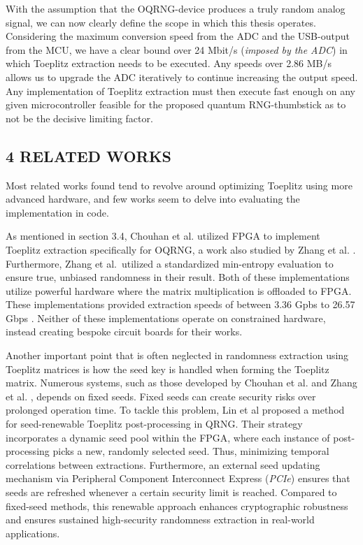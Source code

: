 \documentclass{sigchi}
\begin{document}
With the assumption that the OQRNG-device produces a truly random analog signal, we can now clearly define the scope in which this thesis operates. Considering the maximum conversion speed from the ADC and the USB-output from the MCU, we have a clear bound over 24 Mbit/s (\emph{imposed by the ADC}) in which Toeplitz extraction needs to be executed. Any speeds over 2.86 MB/s allows us to upgrade the ADC iteratively to continue increasing the output speed. Any implementation of Toeplitz extraction must then execute fast enough on any given microcontroller feasible for the proposed quantum RNG-thumbstick as to not be the decisive limiting factor.

\subsection{4 RELATED WORKS}\label{related-works}

Most related works found tend to revolve around optimizing Toeplitz using more advanced hardware, and few works seem to delve into evaluating the implementation in code.

As mentioned in section 3.4, Chouhan et al. \cite{toeplitz-desc} utilized FPGA to implement Toeplitz extraction specifically for OQRNG, a work also studied by Zhang et al. \cite{toeplitz}. Furthermore, Zhang et al.~utilized a standardized min-entropy evaluation to ensure true, unbiased randomness in their result. Both of these implementations utilize powerful hardware where the matrix multiplication is offloaded to FPGA. These implementations provided extraction speeds of between 3.36 Gpbs \cite{toeplitz} to 26.57 Gbps \cite{toeplitz-desc}. Neither of these implementations operate on constrained hardware, instead creating bespoke circuit boards for their works.

Another important point that is often neglected in randomness extraction using Toeplitz matrices is how the seed key is handled when forming the Toeplitz matrix. Numerous systems, such as those developed by Chouhan et al. \cite{toeplitz-desc} and Zhang et al. \cite{toeplitz}, depends on fixed seeds. Fixed seeds can create security risks over prolonged operation time. To tackle this problem, Lin et al \cite{lin} proposed a method for seed-renewable Toeplitz post-processing in QRNG. Their strategy incorporates a dynamic seed pool within the FPGA, where each instance of post-processing picks a new, randomly selected seed. Thus, minimizing temporal correlations between extractions. Furthermore, an external seed updating mechanism via Peripheral Component Interconnect Express (\emph{PCIe}) ensures that seeds are refreshed whenever a certain security limit is reached. Compared to fixed-seed methods, this renewable approach enhances cryptographic robustness and ensures sustained high-security randomness extraction in real-world applications.
\end{document}
